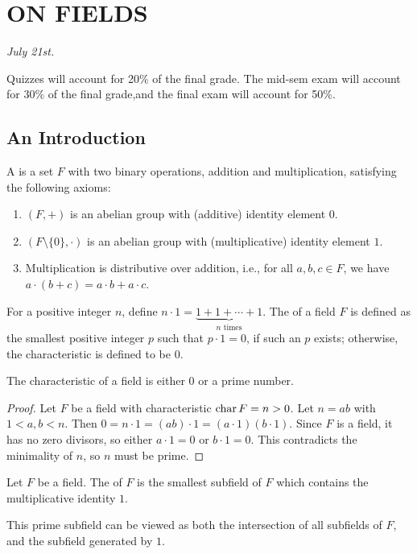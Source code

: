 \chapter{ON FIELDS}

\textit{July 21st.}

Quizzes will account for 20\% of the final grade. The mid-sem exam will account for 30\% of the final grade,and the final exam will account for 50\%.

\section{An Introduction}

A  is a set $F$ with two binary operations, addition and multiplication, satisfying the following axioms:
\begin{enumerate}
    \item $(F,+)$ is an abelian group with (additive) identity element $0$.
    \item $(F\setminus\{0\},\cdot)$ is an abelian group with (multiplicative) identity element $1$.
    \item Multiplication is distributive over addition, i.e., for all $a,b,c\in F$, we have $a\cdot(b+c)=a\cdot b+a\cdot c$.
\end{enumerate}
For a positive integer $n$, define $n \cdot 1 = \underbrace{1 + 1 + \cdots + 1}_{n \text{ times}}$. The  of a field $F$ is defined as the smallest positive integer $p$ such that $p \cdot 1 = 0$, if such an $p$ exists; otherwise, the characteristic is defined to be $0$.

\begin{proposition}
    The characteristic of a field is either $0$ or a prime number.
\end{proposition}
\begin{proof}
    Let $F$ be a field with characteristic $\operatorname{char} F = n > 0$. Let $n = ab$ with $1<a,b<n$. Then $0 = n \cdot 1 = (ab) \cdot 1 = (a \cdot 1)(b \cdot 1)$. Since $F$ is a field, it has no zero divisors, so either $a \cdot 1 = 0$ or $b \cdot 1 = 0$. This contradicts the minimality of $n$, so $n$ must be prime.
\end{proof}

\begin{definition}
    Let $F$ be a field. The  of $F$ is the smallest subfield of $F$ which contains the multiplicative identity $1$.
\end{definition}
This prime subfield can be viewed as both the intersection of all subfields of $F$, and the subfield generated by $1$.
\\

